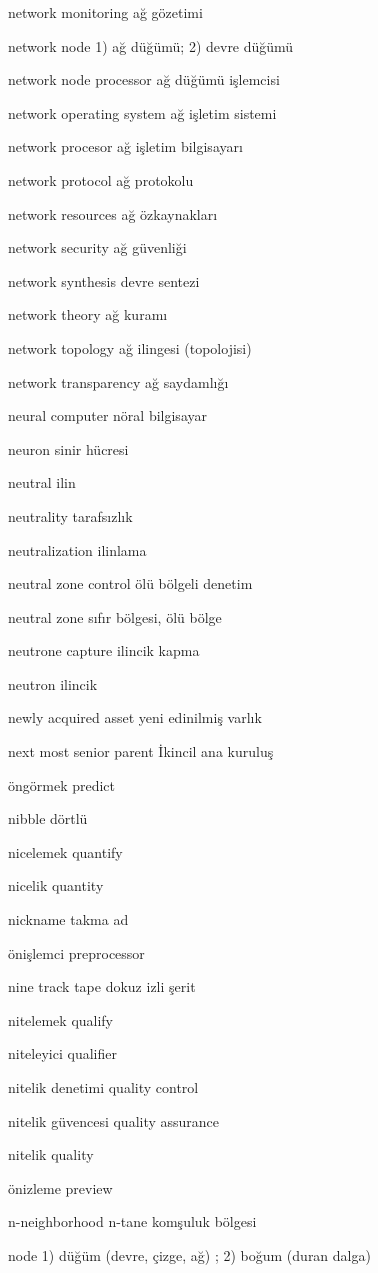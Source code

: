 \documentclass[12pt,fleqn]{article}\usepackage{../../common}
\begin{document}
network monitoring ağ gözetimi

network node 1) ağ düğümü; 2) devre düğümü

network node processor ağ düğümü işlemcisi

network operating system ağ işletim sistemi

network procesor ağ işletim bilgisayarı

network protocol ağ protokolu

network resources ağ özkaynakları

network security ağ güvenliği

network synthesis devre sentezi

network theory ağ kuramı

network topology ağ ilingesi (topolojisi)

network transparency ağ saydamlığı

neural computer nöral bilgisayar

neuron sinir hücresi

neutral ilin

neutrality tarafsızlık

neutralization ilinlama

neutral zone control ölü bölgeli denetim

neutral zone sıfır bölgesi, ölü bölge

neutrone capture ilincik kapma

neutron ilincik

newly acquired asset yeni edinilmiş varlık

next most senior parent İkincil ana kuruluş

öngörmek predict

nibble dörtlü

nicelemek quantify

nicelik quantity

nickname takma ad

önişlemci preprocessor

nine track tape dokuz izli şerit

nitelemek qualify

niteleyici qualifier

nitelik denetimi quality control

nitelik güvencesi quality assurance

nitelik quality

önizleme preview

n-neighborhood n-tane komşuluk bölgesi

node 1) düğüm (devre, çizge, ağ) ; 2) boğum (duran dalga)
\end{document}
